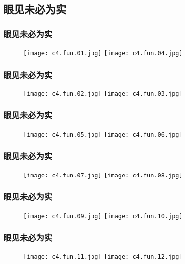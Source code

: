 \subsection{眼见未必为实}
\begin{frame}
  \frametitle{眼见未必为实}
  \begin{figure}
    \centering
    \texttt{[image: c4.fun.01.jpg]}\quad
    \texttt{[image: c4.fun.04.jpg]}
  \end{figure}
\end{frame}

\begin{frame}
  \frametitle{眼见未必为实}
  \begin{figure}
    \centering
    \texttt{[image: c4.fun.02.jpg]}\quad
    \texttt{[image: c4.fun.03.jpg]}
  \end{figure}
\end{frame}

\begin{frame}
  \frametitle{眼见未必为实}
  \begin{figure}
    \centering
    \texttt{[image: c4.fun.05.jpg]}\quad
    \texttt{[image: c4.fun.06.jpg]}
  \end{figure}
\end{frame}

\begin{frame}
  \frametitle{眼见未必为实}
  \begin{figure}
    \centering
    \texttt{[image: c4.fun.07.jpg]}\quad
    \texttt{[image: c4.fun.08.jpg]}
  \end{figure}
\end{frame}

\begin{frame}
  \frametitle{眼见未必为实}
  \begin{figure}
    \centering
    \texttt{[image: c4.fun.09.jpg]}\quad
    \texttt{[image: c4.fun.10.jpg]}
  \end{figure}
\end{frame}

\begin{frame}
  \frametitle{眼见未必为实}
  \begin{figure}
    \centering
    \texttt{[image: c4.fun.11.jpg]}\quad
    \texttt{[image: c4.fun.12.jpg]}
  \end{figure}
\end{frame}

